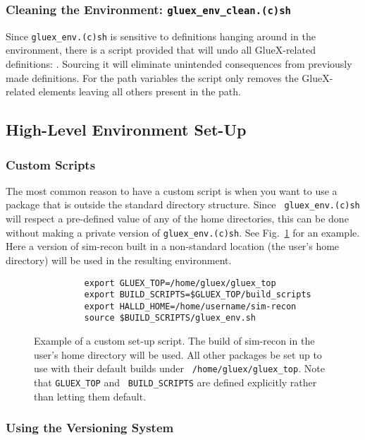 \documentclass[12pt, letterpaper]{article}
\begin{document}
\subsubsection{Cleaning the Environment: {\tt gluex\_env\_clean.(c)sh}}

Since {\tt gluex\_env.(c)sh} is sensitive to definitions hanging
around in the environment, there is a script provided that will undo
all GlueX-related definitions: . Sourcing
it will eliminate unintended consequences from previously made
definitions. For the path variables the script only removes the
GlueX-related elements leaving all others present in the path.

\subsection{High-Level Environment Set-Up}

\subsubsection{Custom Scripts}\label{section:custom-scripts}

The most common reason to have a custom script is when you want to use
a package that is outside the standard directory structure. Since {\tt
  gluex\_env.(c)sh} will respect a pre-defined value of any of the
home directories, this can be done without making a private version of
{\tt gluex\_env.(c)sh}. See Fig.~\ref{figure:custom-script} for an
example. Here a version of sim-recon built in a non-standard location
(the user's home directory) will be used in the resulting environment.

\begin{figure}
\begin{verbatim}
          export GLUEX_TOP=/home/gluex/gluex_top
          export BUILD_SCRIPTS=$GLUEX_TOP/build_scripts
          export HALLD_HOME=/home/username/sim-recon
          source $BUILD_SCRIPTS/gluex_env.sh
\end{verbatim}
\caption{Example of a custom set-up script. The build of sim-recon in
  the user's home directory will be used. All other packages be set up
  to use with their default builds under {\tt
    /home/gluex/gluex\_top}. Note that {\tt GLUEX\_TOP} and {\tt
  BUILD\_SCRIPTS} are defined explicitly rather than letting them
default.}\label{figure:custom-script}
\end{figure}

\subsubsection{Using the Versioning System}\label{section:env-use-versioning}
\end{document}
